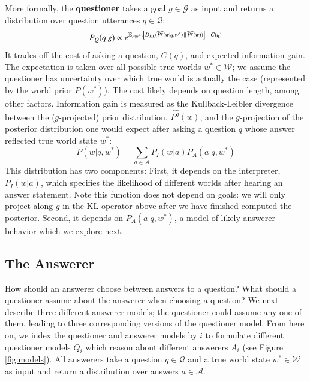 \documentclass[12pt, floatsintext, jou]{apa6}
\begin{document}
More formally, the \textbf{questioner} takes a goal $g \in \mathcal{G}$ as input and returns a distribution over question utterances $q \in \mathcal{Q}$:
%
$$ 
P_{Q}(q|g)  \propto e^{ \mathbb{E}_{P(w^*)}\left [D_{KL}({\widehat{P^g}(w|q, w^*)}\, \| \, {\widehat{P^g}(w)}) \right] - \,\,C(q)}
$$
%
It trades off the cost of asking a question, $C(q)$, and expected information gain. The expectation is taken over all possible true worlds $w^* \in \mathcal{W}$; we assume the questioner has uncertainty over which true world is actually the case (represented by the world prior $P(w^*)$). The cost likely depends on question length, among other factors. Information gain is measured as the Kullback-Leibler divergence between the ($g$-projected) prior distribution, $\widehat{P^g}(w)$, and the $g$-projection of the posterior distribution one would expect after asking a question $q$ whose answer reflected true world state $w^*$:
%
$$P(w|q, w^*) = \sum_{a \in \mathcal{A}} P_I(w | a) P_{A}(a| q, w^*)$$
%
This distribution has two components: 
First, it depends on the interpreter, $P_I(w | a)$, which specifies the likelihood of different worlds after hearing an answer statement. Note this function does not depend on goals: we will only project along $g$ in the KL operator above after we have finished computed the posterior. Second, it depends on $P_{A}(a | q, w^*)$, a model of likely answerer behavior which we explore next.

\subsection{The Answerer}

How should an answerer choose between answers to a question? What should a questioner assume about the answerer when choosing a question? We next describe three different answerer models; the questioner could assume any one of them, leading to three corresponding versions of the questioner model. From here on, we index the questioner and answerer models by $i$ to formulate different questioner models $Q_i$ which reason about different answerers $A_i$ (see Figure \ref{fig:models}).
All answerers take a question $q \in \mathcal{Q}$ and a true world state $w^* \in \mathcal{W}$ as input and return a distribution over answers $a \in \mathcal{A}$.
%
\end{document}
